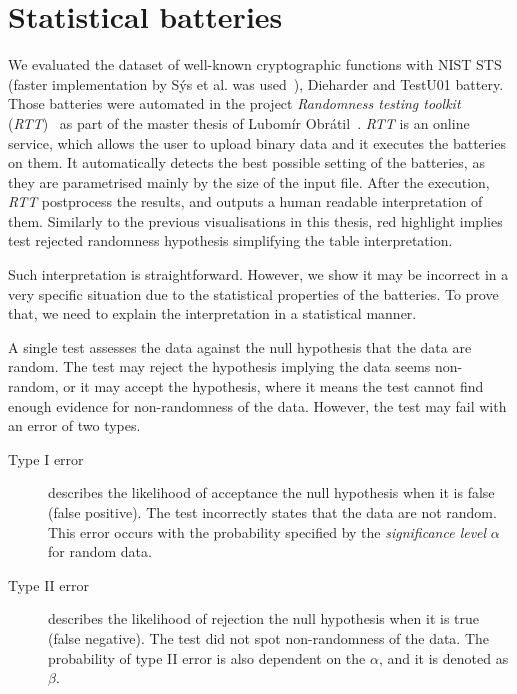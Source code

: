 \documentclass[
    digital,    %
    oneside,    %
    color,
    11pt,
    nocover,
    notable,
    nolof,
    nolot,
]{fithesis3}
\begin{document}
\section{Statistical batteries}
\label{sec:relatwork-stat}

We evaluated the dataset of well-known cryptographic functions with NIST STS (faster implementation by Sýs et al. was used~\cite{sys2016algorithm}), Dieharder and TestU01 battery. Those batteries were automated in the project \textit{Randomness testing toolkit} (\textit{RTT})~\cite{rttgit} as part of the master thesis of Lubomír Obrátil~\cite{obratilMgrThesis}. \textit{RTT} is an online service, which allows the user to upload binary data and it executes the batteries on them. It automatically detects the best possible setting of the batteries, as they are parametrised mainly by the size of the input file. After the execution, \textit{RTT} postprocess the results, and outputs a human readable interpretation of them. Similarly to the previous visualisations in this thesis, red highlight implies test rejected randomness hypothesis simplifying the table interpretation.

Such interpretation is straightforward. However, we show it may be incorrect in a very specific situation due to the statistical properties of the batteries. To prove that, we need to explain the interpretation in a statistical manner.

A single test assesses the data against the null hypothesis that the data are random. The test may reject the hypothesis implying the data seems non-random, or it may accept the hypothesis, where it means the test cannot find enough evidence for non-randomness of the data. However, the test may fail with an error of two types.

\begin{description}
    \item[Type I error] describes the likelihood of acceptance the null hypothesis when it is false (false positive). The test incorrectly states that the data are not random. This error occurs with the probability specified by the \textit{significance level} $\alpha$ for random data.
    \item[Type II error] describes the likelihood of rejection the null hypothesis when it is true (false negative). The test did not spot non-randomness of the data. The probability of type II error is also dependent on the $\alpha$, and it is denoted as $\beta$.
\end{description}
\end{document}
